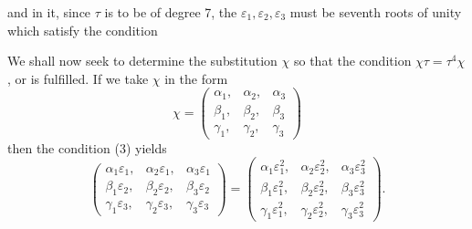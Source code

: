 and in it, since $\tau$ is to be of degree 7, the $\varepsilon_1, \varepsilon_2, \varepsilon_3$
must be seventh roots of unity which satisfy the condition

We shall now seek to determine the substitution $\chi$ so
that the condition $\chi \tau = \tau^4 \chi$, or
is fulfilled. If we take $\chi$ in the form
\[
\chi = \begin{pmatrix} \alpha_1, & \alpha_2, & \alpha_3 \\ \beta_1, & \beta_2, & \beta_3 \\ \gamma_1, & \gamma_2, & \gamma_3 \end{pmatrix}
\]
then the condition (3) yields
\[
\begin{pmatrix} \alpha_1 \varepsilon_1, & \alpha_2 \varepsilon_1, & \alpha_3 \varepsilon_1 \\ \beta_1 \varepsilon_2, & \beta_2 \varepsilon_2, & \beta_3 \varepsilon_2 \\ \gamma_1 \varepsilon_3, & \gamma_2 \varepsilon_3, & \gamma_3 \varepsilon_3 \end{pmatrix}
=
\begin{pmatrix} \alpha_1 \varepsilon_1^2, & \alpha_2 \varepsilon_2^2, & \alpha_3 \varepsilon_3^2 \\ \beta_1 \varepsilon_1^2, & \beta_2 \varepsilon_2^2, & \beta_3 \varepsilon_3^2 \\ \gamma_1 \varepsilon_1^2, & \gamma_2 \varepsilon_2^2, & \gamma_3 \varepsilon_3^2 \end{pmatrix}.
\]

